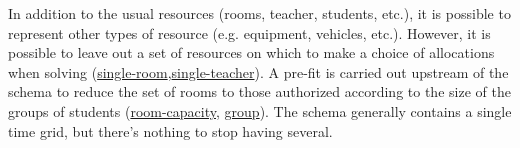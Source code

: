 In addition to the usual resources (rooms, teacher, students, etc.), %
it is possible to represent other types of resource (e.g. equipment, vehicles, etc.).
However, it is possible to leave out a set of resources on which to make a choice of allocations when solving 
(\hyperref[feat:roommodal]{single-room},\hyperref[feat:teachermodal]{single-teacher}).
A pre-fit is carried out upstream of the schema to reduce the set of rooms to those authorized according to the size of the groups of students 
(\hyperref[feat:roomcapacity]{room-capacity}, \hyperref[feat:group]{group}).
 The schema generally contains a single time grid, but there's nothing to stop having several.
